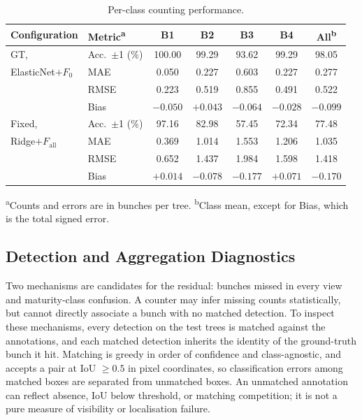 \documentclass[conference,a4paper]{IEEEtran}
\begin{document}
\begin{table}[!tb]
  \centering
  \footnotesize
  \renewcommand{\arraystretch}{1.13}
  \setlength{\tabcolsep}{2pt}
  \caption{Per-class counting performance.}
  \label{tab:summary}
  \begin{tabular*}{\columnwidth}{@{\extracolsep{\fill}}llccccc@{}}
    \toprule
    Configuration & Metric\textsuperscript{a} & B1 & B2 & B3 & B4 & All\textsuperscript{b} \\
    \midrule
    GT,                     & Acc.\ $\pm$1 (\%) & 100.00  & 99.29   & 93.62   & 99.29   & 98.05 \\
    ElasticNet$+F_0$        & MAE             & 0.050   & 0.227   & 0.603   & 0.227   & 0.277 \\
                            & RMSE            & 0.223   & 0.519   & 0.855   & 0.491   & 0.522 \\
                            & Bias            & $-0.050$ & $+0.043$ & $-0.064$ & $-0.028$ & $-0.099$ \\
    \addlinespace[2pt]
    Fixed,                  & Acc.\ $\pm$1 (\%) & 97.16   & 82.98   & 57.45   & 72.34   & 77.48 \\
    Ridge$+F_{\text{all}}$  & MAE             & 0.369   & 1.014   & 1.553   & 1.206   & 1.035 \\
                            & RMSE            & 0.652   & 1.437   & 1.984   & 1.598   & 1.418 \\
                            & Bias            & $+0.014$ & $-0.078$ & $-0.177$ & $+0.071$ & $-0.170$ \\
    \bottomrule
  \end{tabular*}
\par\vspace{1pt}
  \begin{minipage}{\columnwidth}
    \footnotesize\raggedright
    \textsuperscript{a}Counts and errors are in bunches per tree. \textsuperscript{b}Class mean, except for Bias, which is the total signed error.
  \end{minipage}
\end{table}

\subsection{Detection and Aggregation Diagnostics}
\label{sec:attrib}
Two mechanisms are candidates for the residual: bunches missed in every view
and maturity-class confusion. A counter may infer missing counts statistically,
but cannot directly associate a bunch with no matched detection. To inspect
these mechanisms, every detection on the test trees is matched against the
annotations, and each matched detection inherits the identity of the
ground-truth bunch it hit. Matching is greedy in order of confidence and
class-agnostic, and accepts a pair at IoU $\geq 0.5$ in pixel coordinates, so
classification errors among matched boxes are separated from unmatched boxes.
An unmatched annotation can reflect absence, IoU below threshold, or matching
competition; it is not a pure measure of visibility or localisation failure.
\end{document}
